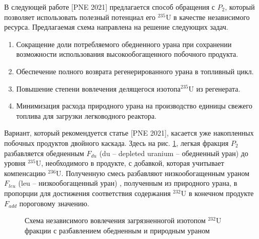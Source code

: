 В следующей работе [PNE 2021] предлагается способ обращения с $P_2$, который позволяет использовать полезный потенциал его $^{235}$U в качестве независимого ресурса. Предлагаемая схема направлена на решение следующих задач.

\begin{enumerate}
  \item Сокращение доли потребляемого обедненного урана при сохранении возможности использования высокообогащенного побочного продукта.
  \item Обеспечение полного возврата регенерированного урана в топливный цикл.
  \item Повышение степени вовлечения делящегося изотопа$^{235}$U из регенерата.
  \item Минимизация расхода природного урана на производство единицы свежего топлива для загрузки легководного реактора.
\end{enumerate}

Вариант, который рекомендуется статье [PNE 2021], касается уже накопленных побочных продуктов двойного каскада. Здесь на рис. \ref{P2utilization}, легкая фракция $P_2$  разбавляется обедненным  $F_{du}$ (du -- depleted uranium -- обедненный уран) до уровня $^{235}$U, необходимого в продукте, с добавкой, которая учитывает компенсацию $^{236}$U. Полученную смесь разбавляют низкообогащенным ураном  $F_{leu}$ (leu -- низкообогащенный уран) , полученным из природного урана, в пропорции для достижения соответствия содержания $^{232}$U в конечном продукте $F_{add}$ пороговому значению.

\begin{figure}[ht]
  \caption{Схема независимого вовлечения загрязненногой изотопом $^{232}$U фракции с разбавлением обедненным и природным ураном}\label{P2utilization}
\end{figure}

